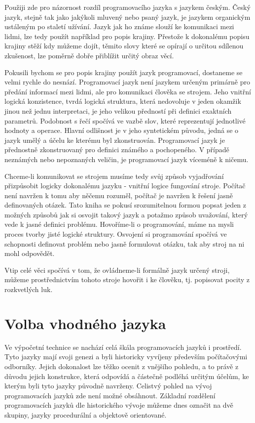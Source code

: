 \documentclass[12pt,twopage]{book}
\newcommand{\oddil}[1]{\section{#1}\label{sec:#1}}
\begin{document}
Použiji zde pro názornost rozdíl programovacího jazyka s jazykem českým. Český jazyk, stejně tak jako jakýkoli mluvený nebo psaný jazyk, je jazykem organickým ustáleným po staletí užívání. Jazyk jak ho známe slouží ke komunikaci mezi lidmi, lze tedy použít například pro popis krajiny. Přestože k dokonalému popisu krajiny stěží kdy můžeme dojít, těmito slovy které se opírají o určitou sdílenou zkušenost, lze poměrně dobře přiblížit určitý obraz věcí.

Pokusili bychom se pro popis krajiny použít jazyk programovací, dostaneme se velmi rychle do nesnází. Programovací jazyk není jazykem určeným primárně pro předání informací mezi lidmi, ale pro komunikaci člověka se strojem. Jeho vnitřní logická konzistence, tvrdá logická struktura, která nedovoluje v jeden okamžik jinou než jednu interpretaci, je jeho velikou předností při definici exaktních parametrů. Podobnost s řečí spočívá ve vazbě slov, které reprezentují jednotlivé hodnoty a operace. Hlavní odlišnost je v jeho syntetickém původu, jedná se o jazyk umělý a účelu ke kterému byl zkonstruován. Programovací jazyk je přednostně zkonstruovaný pro definici známého a pochopeného. V případě neznámých nebo nepoznaných veličin, je programovací jazyk víceméně k ničemu. 

Chceme-li komunikovat se strojem musíme tedy svůj způsob vyjadřování přizpůsobit logicky dokonalému jazyku - vnitřní logice fungování stroje. Počítač není navržen k tomu aby něčemu rozuměl, počítač je navržen k řešení jasně definovaných otázek. Tato kniha se pokusí srozumitelnou formou popsat jeden z možných způsobů jak si osvojit takový jazyk a potažmo způsob uvažování, který vede k jasné definici problému. Hovoříme-li o programování, máme na mysli proces tvorby jisté logické struktury. Osvojení si programování spočívá ve schopnosti definovat problém nebo jasně formulovat otázku, tak aby stroj na ni mohl odpovědět.

Vtip celé věci spočívá v tom, že ovládneme-li formálně jazyk určený stroji, můžeme prostřednictvím tohoto stroje hovořit i ke člověku, tj. popisovat pocity z rozkvetlých luk.

\oddil{Volba vhodného jazyka}


Ve výpočetní technice se nachází celá škála programovacích jazyků i prostředí. Tyto jazyky mají svoji genezi a byli historicky vyvíjeny především počítačovými odborníky. Jejich dokonalost lze těžko ocenit z vnějšího pohledu, a to právě z důvodu jejich konstrukce, která odpovídá a částečně podléhá určitým účelům, ke kterým byli tyto jazyky původně navrženy. Celistvý pohled na vývoj programovacích jazyků zde není možné obsáhnout. Základní rozdělení programovacích jazyků dle historického vývoje můžeme dnes označit na dvě skupiny, jazyky procedurální a objektově orientované.
\end{document}
